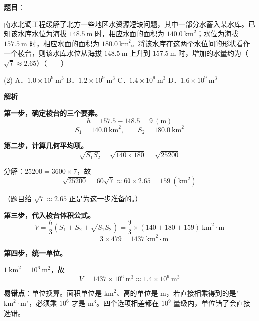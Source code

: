 \begin{answer}

\textbf{题目}：

南水北调工程缓解了北方一些地区水资源短缺问题，其中一部分水蓄入某水库。已知该水库水位为海拔 $148.5\ \mathrm m$ 时，相应水面的面积为 $140.0\ \mathrm{km}^{2}$；水位为海拔 $157.5\ \mathrm m$ 时，相应水面的面积为 $180.0\ \mathrm{km}^{2}$。将该水库在这两个水位间的形状看作一个棱台，则该水库水位从海拔 $148.5\ \mathrm m$ 上升到 $157.5\ \mathrm m$ 时，增加的水量约为（$\sqrt7\approx2.65$）\mbox{（　　）}

\begin{gkopts}(2)
\task A．$1.0\times10^{9}\ \mathrm m^{3}$
\task B．$1.2\times10^{9}\ \mathrm m^{3}$
\task C．$1.4\times10^{9}\ \mathrm m^{3}$
\task D．$1.6\times10^{9}\ \mathrm m^{3}$
\end{gkopts}

\textbf{解析}

\textbf{第一步，确定棱台的三个要素。}
\nopagebreak[4]
\[h=157.5-148.5=9\ (\mathrm m)\]
\nopagebreak[4]
\[S_1=140.0\ \mathrm{km}^{2},\qquad S_2=180.0\ \mathrm{km}^{2}\]

\textbf{第二步，计算几何平均项。}
\nopagebreak[4]
\[\sqrt{S_1S_2}=\sqrt{140\times180}=\sqrt{25200}\]

分解：$25200=3600\times7$，故
\nopagebreak[4]
\[\sqrt{25200}=60\sqrt7\approx60\times2.65=159\ (\mathrm{km}^{2})\]

（题目给 $\sqrt7\approx2.65$ 正是为这一步准备的。）

\textbf{第三步，代入棱台体积公式。}
\nopagebreak[4]
\[V=\frac h3\left(S_1+S_2+\sqrt{S_1S_2}\right)=\frac93\times(140+180+159)\ \mathrm{km}^{2}\cdot\mathrm m\]
\nopagebreak[4]
\[=3\times479=1437\ \mathrm{km}^{2}\cdot\mathrm m\]

\textbf{第四步，统一单位。}

$1\ \mathrm{km}^{2}=10^{6}\ \mathrm m^{2}$，故
\nopagebreak[4]
\[V=1437\times10^{6}\ \mathrm m^{3}\approx1.4\times10^{9}\ \mathrm m^{3}\]

\begin{gktip}
\textbf{易错点}：单位换算。面积单位是 $\mathrm{km}^2$、高的单位是 $\mathrm m$，若直接相乘得到的是"$\mathrm{km}^2\cdot\mathrm m$"，必须乘 $10^{6}$ 才是 $\mathrm m^3$。四个选项相差都在 $10^{9}$ 量级内，单位错了会直接选错。
\end{gktip}


\par\medskip

\end{answer}

